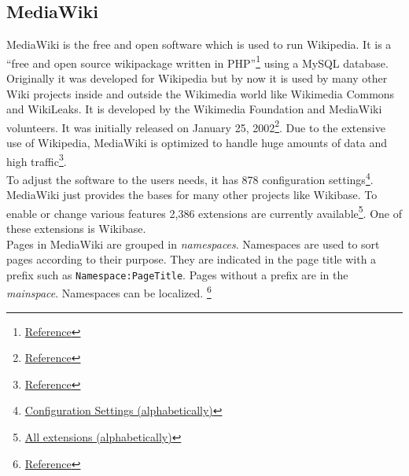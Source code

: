 \subsection{MediaWiki}

MediaWiki is the free and open software which is used to run Wikipedia. It is a ``free and open source wikipackage written in PHP''\footnote{\href{https://www.mediawiki.org/wiki/MediaWiki}{Reference}} using a MySQL database. Originally it was developed for Wikipedia but by now it is used by many other Wiki projects inside and outside the Wikimedia world like Wikimedia Commons and WikiLeaks. It is developed by the Wikimedia Foundation and MediaWiki volunteers. It was initially released on January 25, 2002\footnote{\href{https://en.wikipedia.org/wiki/MediaWiki}{Reference}}. Due to the extensive use of Wikipedia, MediaWiki is optimized to handle huge amounts of data and high traffic\footnote{\href{https://www.mediawiki.org/w/index.php?title=Manual:What_is_MediaWiki\%3F&oldid=743778}{Reference}}. \\
To adjust the software to the users needs, it has 878 configuration settings\footnote{\href{https://www.mediawiki.org/wiki/Manual:Configuration_settings_\%28alphabetical\%29}{Configuration Settings (alphabetically)}}. \\
MediaWiki just provides the bases for many other projects like Wikibase. To enable or change various features 2,386 extensions are currently available\footnote{\href{https://www.mediawiki.org/wiki/Category:All_extensions}{All extensions (alphabetically)}}. One of these extensions is Wikibase. \\
Pages in MediaWiki are grouped in \textit{namespaces}. Namespaces are used to sort pages according to their purpose. They are indicated in the page title with a prefix such as \texttt{Namespace:PageTitle}. Pages without a prefix are in the \textit{mainspace}. Namespaces can be localized. \footnote{\href{https://www.mediawiki.org/wiki/Help:Namespaces}{Reference}}